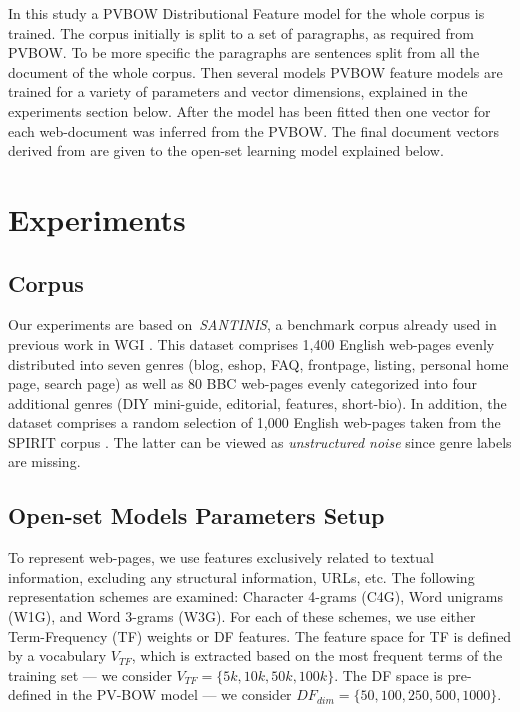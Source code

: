In this study a PVBOW Distributional Feature model for the whole corpus is trained. The corpus initially is split to a set of paragraphs, as required from PVBOW. To be more specific the paragraphs are sentences split from all the document of the whole corpus. Then several models PVBOW feature models are trained for a variety of parameters and vector dimensions, explained in the experiments section below. After the model has been fitted then one vector for each web-document was inferred from the PVBOW. The final document vectors derived from  are given to the open-set learning model explained below. 

\section{Experiments}\label{chap:word_embeddings:sec:experiments_setup}

\subsection{Corpus}\label{chap:word_embeddings:sec:experiments_corpora}
Our experiments are based on~\textit{SANTINIS}, a benchmark corpus already used in previous work in WGI \parencite{mehler2010genres_on_web,pritsos2018open,santini2007automatic}. This dataset comprises 1,400 English web-pages evenly distributed into seven genres (blog, eshop, FAQ, frontpage, listing, personal home page, search page) as well as 80 BBC web-pages evenly categorized into four additional genres (DIY mini-guide, editorial, features, short-bio). In addition, the dataset comprises a random selection of 1,000 English web-pages taken from the SPIRIT corpus \parencite{joho2004spirit}. The latter can be viewed as \emph{unstructured noise} since genre labels are missing. 

%
\subsection{Open-set Models Parameters Setup}\label{chap:word_embeddings:sec:experiments_params}
To represent web-pages, we use features exclusively related to textual information, excluding any structural information, URLs, etc. The following representation schemes are examined: Character 4-grams (C4G), Word unigrams (W1G), and Word 3-grams (W3G). For each of these schemes, we use either Term-Frequency (TF) weights or DF features. The feature space for TF is defined by a vocabulary $V_{TF}$, which is extracted based on the most frequent terms of the training set --- we consider $V_{TF}=\{5k,10k,50k,100k\}$. The DF space is pre-defined in the PV-BOW model --- we consider $DF_{dim}=\{50,100,250,500,1000\}$.

